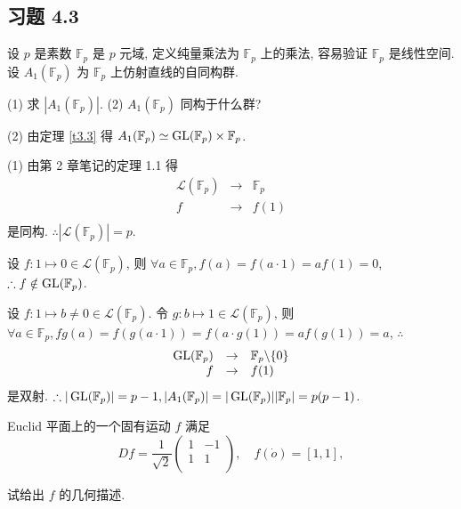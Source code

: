 \documentclass[color=black,device=normal,lang=cn,mode=geye]{elegantnote}
\begin{document}
\subsection{习题 4.3}
    
\begin{exercise}%
    设 $p$ 是素数 $\mathbb{F}_p$ 是 $p$ 元域, 定义纯量乘法为 $\mathbb{F}_p$ 上的乘法, 容易验证 $\mathbb{F}_p$ 是线性空间. 设 $A_1(\mathbb{F}_p)$ 为 $\mathbb{F}_p$ 上仿射直线的自同构群.

    (1) 求 $|A_1(\mathbb{F}_p)|$. (2) $A_1(\mathbb{F}_p)$ 同构于什么群?
\end{exercise}
\begin{solution}
    (2) 由定理 \ref{t3.3} 得 $A_1(\mathbb{F}_p)\simeq\operatorname{GL} (\mathbb{F}_p)\times\mathbb{F}_p$.

    (1) 由第 2 章笔记的定理 1.1 得
    \[\begin{array}{rcl}
        \mathcal{L}(\mathbb{F}_p) & \to & \mathbb{F}_p \\
        f & \to & f(1) \\
    \end{array}\]
    是同构. $\therefore|\mathcal{L}(\mathbb{F}_p)|=p$.

    设 $f:1\mapsto0\in\mathcal{L}(\mathbb{F}_p)$, 则 $\forall a\in\mathbb{F}_p,f(a)=f(a\cdot 1)=af(1)=0$, $\therefore f\notin\operatorname{GL} (\mathbb{F}_p)$.

    设 $f:1\mapsto b\neq0\in\mathcal{L}(\mathbb{F}_p)$. 令 $g:b\mapsto 1\in\mathcal{L}(\mathbb{F}_p)$, 则 $\forall a\in\mathbb{F}_p,fg(a)=f(g(a\cdot 1))=f(a\cdot g(1))=af(g(1))=a$, $\therefore$
    \[\begin{array}{rcl}
        \operatorname{GL} (\mathbb{F}_p) & \to & \mathbb{F}_p\backslash\{0\} \\
        f & \to & f(1) \\
    \end{array}\]
    是双射. $\therefore|\operatorname{GL} (\mathbb{F}_p)|=p-1,|A_1(\mathbb{F}_p)|=|\operatorname{GL} (\mathbb{F}_p)||\mathbb{F}_p|=p(p-1)$.
\end{solution}
\begin{exercise}%
    Euclid 平面上的一个固有运动 $f$ 满足
    \[Df=\dfrac{1}{\sqrt{2}}\begin{pmatrix}
        1 & -1 \\
        1 & 1 \\
    \end{pmatrix},\quad f(\dot{o})=[1,1],\]

    试给出 $f$ 的几何描述.
\end{exercise}
\end{document}
